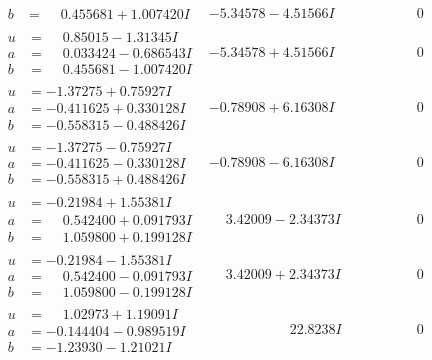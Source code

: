 \documentclass[1p]{elsarticle_modified}
\theoremstyle{definition}
\begin{document}
$$\begin{array}{c|c|c}
\begin{aligned}
b &= \phantom{-}0.455681 + 1.007420 I\end{aligned}
 & -5.34578 - 4.51566 I & \phantom{-0.000000 } 0 \\ \hline\begin{aligned}
u &= \phantom{-}0.85015 - 1.31345 I \\
a &= \phantom{-}0.033424 - 0.686543 I \\
b &= \phantom{-}0.455681 - 1.007420 I\end{aligned}
 & -5.34578 + 4.51566 I & \phantom{-0.000000 } 0 \\ \hline\begin{aligned}
u &= -1.37275 + 0.75927 I \\
a &= -0.411625 + 0.330128 I \\
b &= -0.558315 - 0.488426 I\end{aligned}
 & -0.78908 + 6.16308 I & \phantom{-0.000000 } 0 \\ \hline\begin{aligned}
u &= -1.37275 - 0.75927 I \\
a &= -0.411625 - 0.330128 I \\
b &= -0.558315 + 0.488426 I\end{aligned}
 & -0.78908 - 6.16308 I & \phantom{-0.000000 } 0 \\ \hline\begin{aligned}
u &= -0.21984 + 1.55381 I \\
a &= \phantom{-}0.542400 + 0.091793 I \\
b &= \phantom{-}1.059800 + 0.199128 I\end{aligned}
 & \phantom{-}3.42009 - 2.34373 I & \phantom{-0.000000 } 0 \\ \hline\begin{aligned}
u &= -0.21984 - 1.55381 I \\
a &= \phantom{-}0.542400 - 0.091793 I \\
b &= \phantom{-}1.059800 - 0.199128 I\end{aligned}
 & \phantom{-}3.42009 + 2.34373 I & \phantom{-0.000000 } 0 \\ \hline\begin{aligned}
u &= \phantom{-}1.02973 + 1.19091 I \\
a &= -0.144404 - 0.989519 I \\
b &= -1.23930 - 1.21021 I\end{aligned}
 & \phantom{-0.000000 -}22.8238 I & \phantom{-0.000000 } 0 \\ \hline\begin{aligned}

\end{aligned}
\end{array}$$
\end{document}
